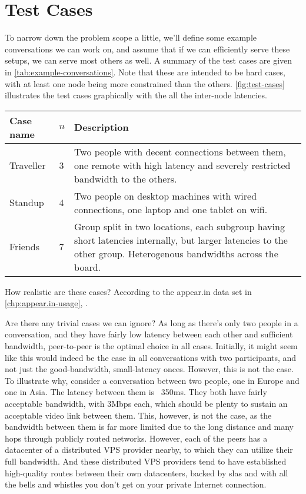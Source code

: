 \chapter{Test Cases}

To narrow down the problem scope a little, we'll define some example conversations we can work on, and assume that if we can efficiently serve these setups, we can serve most others as well. A summary of the test cases are given in \autoref{tab:example-conversations}. Note that these are intended to be hard cases, with at least one node being more constrained than the others. \autoref{fig:test-cases} illustrates the test cases graphically with the all the inter-node latencies.

\begin{center}
    \label{tab:example-conversations}
    \begin{tabular}{| l | l | p{7cm} |}
    \hline
    \textbf{Case name} & \textbf{$n$} & \textbf{Description} \\ \hline
    Traveller & 3 & Two people with decent connections between them, one remote with high latency and severely restricted bandwidth to the others. \\ \hline
    Standup & 4 & Two people on desktop machines with wired connections, one laptop and one tablet on wifi. \\ \hline
    Friends & 7 & Group split in two locations, each subgroup having short latencies internally, but larger latencies to the other group. Heterogenous bandwidths across the board. \\ \hline
    \end{tabular}
\end{center}

How realistic are these cases? According to the appear.in data set in \autoref{chp:appear.in-usage}, .

Are there any trivial cases we can ignore? As long as there's only two people in a conversation, and they have fairly low latency between each other and sufficient bandwidth, peer-to-peer is the optimal choice in all cases. Initially, it might seem like this would indeed be the case in all conversations with two participants, and not just the good-bandwidth, small-latency onces. However, this is not the case. To illustrate why, consider a conversation between two people, one in Europe and one in Asia. The latency between them is ~350ms. They both have fairly acceptable bandwidth, with 3Mbps each, which should be plenty to sustain an acceptable video link between them. This, however, is not the case, as the bandwidth between them is far more limited due to the long distance and many hops through publicly routed networks. However, each of the peers has a datacenter of a distributed VPS provider nearby, to which they can utilize their full bandwidth. And these distributed VPS providers tend to have established high-quality routes between their own datacenters, backed by \glspl{sla} and with all the bells and whistles you don't get on your private Internet connection.

